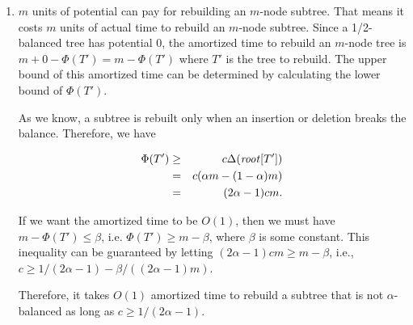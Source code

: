 \documentclass[a4paper, fleqn]{article}
\begin{document}
\begin{enumerate}
\renewcommand{\labelenumi}{\itshape \bfseries \alph{enumi}.}

\item  %

$m$ units of potential can pay for rebuilding an $m$-node subtree.
That means it costs $m$ units of actual time to rebuild an $m$-node
subtree. Since a 1/2-balanced tree has potential 0, the amortized time
to rebuild an $m$-node tree is $m + 0 - \Phi(T') = m - \Phi(T')$
where $T'$ is the tree to rebuild. The upper bound of this amortized
time can be determined by calculating the lower bound of $\Phi(T')$.

As we know, a subtree is rebuilt only when an insertion or deletion
breaks the balance. Therefore, we have

\begin{eqnarray*}
\Phi(T')
& \geq & c \Delta(\id{root}[T']) \\
& = & c (\alpha m - (1-\alpha) m) \\
& = & (2\alpha - 1)cm.
\end{eqnarray*}

If we want the amortized time to be $O(1)$, then we must have $m -
\Phi(T') \leq \beta$, i.e. $\Phi(T') \geq m - \beta$, where $\beta$ is
some constant. This inequality can be guaranteed by letting $(2\alpha
- 1)cm \geq m - \beta$, i.e., $c \geq 1/(2\alpha
- 1) - \beta/((2\alpha - 1)m)$.

Therefore, it takes $O(1)$ amortized time to rebuild a subtree that is
not $\alpha$-balanced as long as $c \geq 1/(2\alpha - 1)$.
\end{enumerate}
\end{document}

